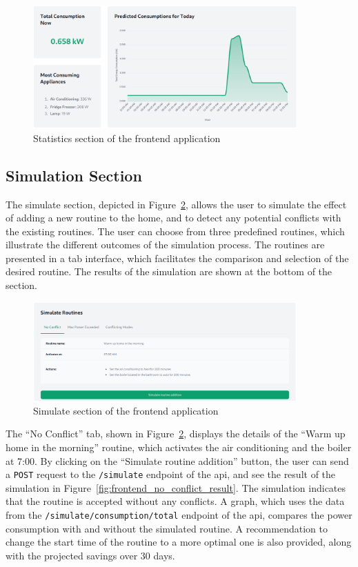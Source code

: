 \begin{figure}
    \centering
    \includegraphics[width=0.9\textwidth]{images/frontend/statistics.png}
    \caption{Statistics section of the frontend application}%
    \label{fig:frontend_statistics}
\end{figure}

\subsection{Simulation Section}

The simulate section, depicted in Figure~\ref{fig:frontend_simulate}, allows the user to simulate the effect of adding a new routine to the home, and to detect any potential conflicts with the existing routines. The user can choose from three predefined routines, which illustrate the different outcomes of the simulation process. The routines are presented in a tab interface, which facilitates the comparison and selection of the desired routine. The results of the simulation are shown at the bottom of the section.

\begin{figure}
    \centering
    \includegraphics[width=0.9\textwidth]{images/frontend/simulate.png}
    \caption{Simulate section of the frontend application}%
    \label{fig:frontend_simulate}
\end{figure}

The ``No Conflict'' tab, shown in Figure~\ref{fig:frontend_simulate}, displays the details of the ``Warm up home in the morning'' routine, which activates the air conditioning and the boiler at 7:00. By clicking on the ``Simulate routine addition'' button, the user can send a \texttt{POST} request to the \texttt{/simulate} endpoint of the \acrshort{api}, and see the result of the simulation in Figure~\ref{fig:frontend_no_conflict_result}. The simulation indicates that the routine is accepted without any conflicts. A graph, which uses the data from the \texttt{/simulate/consumption/total} endpoint of the \acrshort{api}, compares the power consumption with and without the simulated routine. A recommendation to change the start time of the routine to a more optimal one is also provided, along with the projected savings over 30 days.

